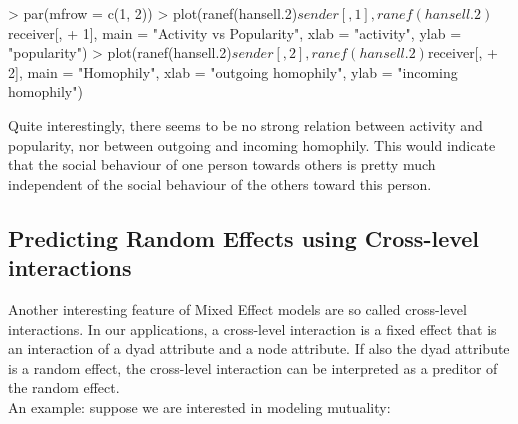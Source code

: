 \documentclass[a4paper]{article}
\begin{document}
\begin{Schunk}
\begin{Sinput}
> par(mfrow = c(1, 2))
> plot(ranef(hansell.2)$sender[, 1], ranef(hansell.2)$receiver[, 
+     1], main = "Activity vs Popularity", xlab = "activity", ylab = "popularity")
> plot(ranef(hansell.2)$sender[, 2], ranef(hansell.2)$receiver[, 
+     2], main = "Homophily", xlab = "outgoing homophily", ylab = "incoming homophily")
\end{Sinput}
\end{Schunk}

Quite interestingly, there seems to be no strong relation between activity and popularity, nor between outgoing and incoming homophily.
This would indicate that the social behaviour of one person towards others is pretty much independent of the social behaviour of the others 
toward this person. 

\subsection{Predicting Random Effects using Cross-level interactions}

Another interesting feature of Mixed Effect models are so called cross-level interactions. In our applications, a cross-level 
interaction is a fixed effect that is an interaction of a dyad attribute and a node attribute. If also the dyad attribute
is a random effect, the cross-level interaction can be interpreted as a preditor of the random effect. \\

An example: suppose we are interested in modeling mutuality:
\end{document}
